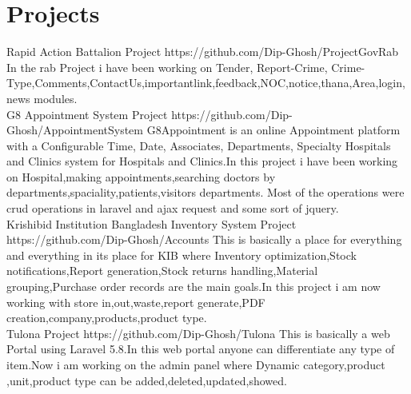 \documentclass[]{cv-style}
\begin{document}
\section{Projects}
\begin{entrylist}
\entry
{}
{Rapid Action Battalion Project}
{{https://github.com/Dip-Ghosh/ProjectGovRab}}
{In the rab Project i have been working on Tender, Report-Crime, Crime-Type,Comments,ContactUs,importantlink,feedback,NOC,notice,thana,Area,login,news modules.}
\\
\entry
{}
{G8 Appointment System Project }
{{https://github.com/Dip-Ghosh/AppointmentSystem}}
{G8Appointment is an online Appointment platform with a Configurable Time, Date, Associates, Departments, Specialty Hospitals and Clinics system for Hospitals and Clinics.In this project i have been working on  Hospital,making appointments,searching doctors by departments,spaciality,patients,visitors departments. Most of the operations were crud operations in laravel and ajax request and some sort of jquery.}
\\
\entry 
{}
{Krishibid Institution Bangladesh Inventory System Project }
{{https://github.com/Dip-Ghosh/Accounts}}
{This is basically a place for everything and everything in its place for KIB where Inventory optimization,Stock notifications,Report generation,Stock returns handling,Material grouping,Purchase order records are the main goals.In this project i am now working with store in,out,waste,report generate,PDF creation,company,products,product type.}\\
\entry 
{}
{Tulona Project }
{{https://github.com/Dip-Ghosh/Tulona}}
{This is basically a web Portal using Laravel 5.8.In this web portal anyone can differentiate any type of item.Now i am working on the admin panel where Dynamic category,product ,unit,product type can be added,deleted,updated,showed.}
\end{entrylist}
\clearpage
\hspace{82cm}
\vspace{0.7cm}
\end{document}
